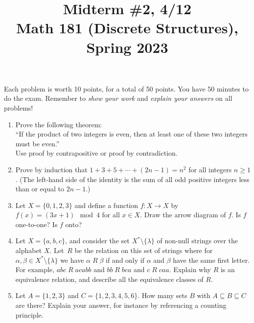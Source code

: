 \documentclass[11pt]{article}
\title{Midterm \#2, 4/12 \\Math 181 (Discrete Structures), Spring 2023}
\date{}
\begin{document}
\maketitle

\thispagestyle{empty}

\vspace{-1cm}

Each problem is worth 10 points, for a total of 50 points. You have 50 minutes to do the exam. Remember to \emph{show your work} and \emph{explain your answers} on all problems!

\begin{enumerate}

\item Prove the following theorem: \\``If the product of two integers is even, then at least one of these two integers must be even.'' \\Use proof by contrapositive or proof by contradiction.

\item Prove by induction that $1+3+5 + \cdots + (2n-1) = n^2$ for all integers $n\geq 1$. (The left-hand side of the identity is the sum of all odd positive integers less than or equal to $2n-1$.)

\item Let $X = \{0,1,2,3\}$ and define a function $f\colon X \to X$ by $f(x) = (3x + 1) \mod 4$ for all $x \in X$. Draw the arrow diagram of $f$. Is $f$ one-to-one? Is $f$ onto?

\item Let $X = \{a,b,c\}$, and consider the set $X^* \setminus \{\lambda\}$ of non-null strings over the alphabet $X$. Let~$R$ be the relation on this set of strings where for $\alpha, \beta \in X^* \setminus \{\lambda\}$ we have $\alpha \; R \; \beta$ if and only if $\alpha$ and $\beta$ have the same first letter. For example, $abc \; R \; acabb$ and $bb \; R \; bca$ and $c \; R \; caa$. Explain why $R$ is an equivalence relation, and describe all the equivalence classes of $R$.

\item Let $A = \{1,2,3\}$ and $C = \{1,2,3,4,5,6\}$. How many sets $B$ with $A \subseteq B \subseteq C$ are there? Explain your answer, for instance by referencing a counting principle.


\end{enumerate}
\end{document}
